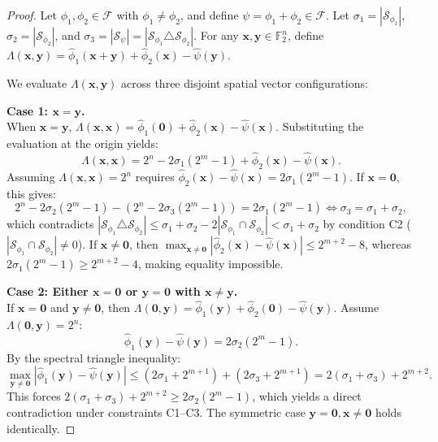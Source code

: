 \documentclass[pdflatex,sn-mathphys-num]{sn-jnl}%
\theoremstyle{thmstyleone}%
\theoremstyle{thmstyletwo}%
\theoremstyle{thmstylethree}%
\begin{document}
\begin{proof}
Let $\phi_1, \phi_2 \in \mathcal{F}$ with $\phi_1 \neq \phi_2$, and define $\psi = \phi_1 + \phi_2 \in \mathcal{F}$. Let $\sigma_1 = |\mathcal{S}_{\phi_1}|$, $\sigma_2 = |\mathcal{S}_{\phi_2}|$, and $\sigma_3 = |\mathcal{S}_{\psi}| = |\mathcal{S}_{\phi_1} \triangle \mathcal{S}_{\phi_2}|$. For any $\mathbf{x}, \mathbf{y} \in \mathbb{F}_2^n$, define $\Lambda(\mathbf{x}, \mathbf{y}) = \widehat{\phi}_1(\mathbf{x}+\mathbf{y}) + \widehat{\phi}_2(\mathbf{x}) - \widehat{\psi}(\mathbf{y})$.


We evaluate $\Lambda(\mathbf{x}, \mathbf{y})$ across three disjoint spatial vector configurations:

\textbf{Case 1: $\mathbf{x} = \mathbf{y}$.} \\
When $\mathbf{x} = \mathbf{y}$,  $\Lambda(\mathbf{x}, \mathbf{x}) = \widehat{\phi}_1(\mathbf{0}) + \widehat{\phi}_2(\mathbf{x}) - \widehat{\psi}(\mathbf{x})$. Substituting the evaluation at the origin yields:
\[
\Lambda(\mathbf{x}, \mathbf{x}) = 2^n - 2\sigma_1(2^m - 1) + \widehat{\phi}_2(\mathbf{x}) - \widehat{\psi}(\mathbf{x}).
\]
Assuming $\Lambda(\mathbf{x}, \mathbf{x}) = 2^n$ requires $\widehat{\phi}_2(\mathbf{x}) - \widehat{\psi}(\mathbf{x}) = 2\sigma_1(2^m - 1)$. If $\mathbf{x} = \mathbf{0}$, this gives:
\[
2^n - 2\sigma_2(2^m - 1) - \left(2^n - 2\sigma_3(2^m - 1)\right) = 2\sigma_1(2^m - 1) \iff \sigma_3 = \sigma_1 + \sigma_2,
\]
which contradicts $|\mathcal{S}_{\phi_1} \triangle \mathcal{S}_{\phi_2}| \leq \sigma_1 + \sigma_2 - 2|\mathcal{S}_{\phi_1} \cap \mathcal{S}_{\phi_2}| < \sigma_1 + \sigma_2$ by condition C2 ($|\mathcal{S}_{\phi_1} \cap \mathcal{S}_{\phi_2}| \neq 0$). If $\mathbf{x} \neq \mathbf{0}$, then $\max_{\mathbf{x} \neq \mathbf{0}} |\widehat{\phi}_2(\mathbf{x}) - \widehat{\psi}(\mathbf{x})| \leq 2^{m+2} - 8$, whereas $2\sigma_1(2^m - 1) \geq 2^{m+2} - 4$, making equality impossible.

\textbf{Case 2: Either $\mathbf{x} = \mathbf{0}$ or $\mathbf{y} = \mathbf{0}$ with $\mathbf{x} \neq \mathbf{y}$.} \\
If $\mathbf{x} = \mathbf{0}$ and $\mathbf{y} \neq \mathbf{0}$, then $\Lambda(\mathbf{0}, \mathbf{y}) = \widehat{\phi}_1(\mathbf{y}) + \widehat{\phi}_2(\mathbf{0}) - \widehat{\psi}(\mathbf{y})$. Assume $\Lambda(\mathbf{0}, \mathbf{y}) = 2^n$:
\[
\widehat{\phi}_1(\mathbf{y}) - \widehat{\psi}(\mathbf{y}) = 2\sigma_2(2^m - 1).
\]
By the spectral triangle inequality:
\[
\max_{\mathbf{y} \neq \mathbf{0}} |\widehat{\phi}_1(\mathbf{y}) - \widehat{\psi}(\mathbf{y})| \leq (2\sigma_1 + 2^{m+1}) + (2\sigma_3 + 2^{m+1}) = 2(\sigma_1 + \sigma_3) + 2^{m+2}.
\]
This forces $2(\sigma_1 + \sigma_3) + 2^{m+2} \geq 2\sigma_2(2^m - 1)$, which yields a direct contradiction under constraints C1–C3. The symmetric case $\mathbf{y} = \mathbf{0}, \mathbf{x} \neq \mathbf{0}$ holds identically.


\end{proof}
\end{document}
